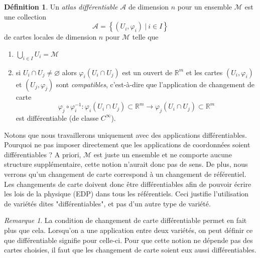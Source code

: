 \documentclass[a4paper,11pt]{report}
\theoremstyle{definition}
\theoremstyle{plain}
\theoremstyle{definition}
\newtheorem{defn}{Définition}[chapter]
\theoremstyle{remark}
\newtheorem{rmk}{Remarque}[chapter]
\newcommand{\M}{\mathscr{M}}
\newcommand{\A}{\mathcal{A}}
\newcommand{\Rm}{\mathbb{R}^m}
\begin{document}
            \begin{defn}
                Un \textit{atlas différentiable} $\A$ de dimension $n$ pour un ensemble $\M$ est une collection 
                \begin{equation}
                    \A = \left\{ (U_i,\varphi_i)~|~i\in I \right\}
                \end{equation}
                de cartes locales de dimension $n$ pour $\M$ telle que
                \begin{enumerate}[label=\textit{(\roman*)}]
                    \item $\bigcup_{i\in I} U_i = \M$
                    \item si $U_i\cap U_j \neq \varnothing$ alors $\varphi_i(U_i\cap U_j)$ est un ouvert de $\Rm$ et les cartes $(U_i,\varphi_i)$ et $(U_j,\varphi_j)$ sont \textit{compatibles}, c'est-à-dire que l'application de changement de carte
                        \begin{equation}
                            \varphi_j\circ\varphi_i^{-1}:\varphi_i(U_i\cap U_j)\subset\Rm\to\varphi_j(U_i\cap U_j)\subset\Rm
                        \end{equation}
                        est différentiable (de classe $C^\infty$).
                \end{enumerate}
            \end{defn}
            
            Notons que nous travaillerons uniquement avec des applications différentiables. Pourquoi ne pas imposer directement que les applications de coordonnées soient différentiables ? A priori, $\M$ est juste un ensemble et ne comporte aucune structure supplémentaire, cette notion n'aurait donc pas de sens. De plus, nous verrons qu'un changement de carte correspond à un changement de référentiel. Les changements de carte doivent donc être différentiables afin de pouvoir écrire les lois de la physique (EDP) dans tous les référentiels. Ceci justifie l'utilisation de variétés dites "différentiables", et pas d'un autre type de variété.
            
            \begin{rmk}
                La condition de changement de carte différentiable permet en fait plus que cela. Lorsqu'on a une application entre deux variétés, on peut définir ce que différentiable signifie pour celle-ci. Pour que cette notion ne dépende pas des cartes choisies, il faut que les changement de carte soient eux aussi différentiables.
            \end{rmk}
            
\end{document}
